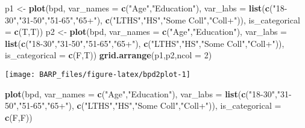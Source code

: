 \documentclass[]{article}
\newenvironment{Shaded}{\begin{snugshade}}{\end{snugshade}}
\newcommand{\KeywordTok}[1]{\textcolor[rgb]{0.13,0.29,0.53}{\textbf{#1}}}
\newcommand{\DataTypeTok}[1]{\textcolor[rgb]{0.13,0.29,0.53}{#1}}
\newcommand{\DecValTok}[1]{\textcolor[rgb]{0.00,0.00,0.81}{#1}}
\newcommand{\StringTok}[1]{\textcolor[rgb]{0.31,0.60,0.02}{#1}}
\newcommand{\NormalTok}[1]{#1}
\begin{document}
\begin{Shaded}
\begin{Highlighting}[]
\NormalTok{p1 <-}\StringTok{ }\KeywordTok{plot}\NormalTok{(bpd,}
     \DataTypeTok{var_names =} \KeywordTok{c}\NormalTok{(}\StringTok{"Age"}\NormalTok{,}\StringTok{"Education"}\NormalTok{),}
     \DataTypeTok{var_labs =} \KeywordTok{list}\NormalTok{(}\KeywordTok{c}\NormalTok{(}\StringTok{"18-30"}\NormalTok{,}\StringTok{"31-50"}\NormalTok{,}\StringTok{"51-65"}\NormalTok{,}\StringTok{"65+"}\NormalTok{),}
                     \KeywordTok{c}\NormalTok{(}\StringTok{"LTHS"}\NormalTok{,}\StringTok{"HS"}\NormalTok{,}\StringTok{"Some Coll"}\NormalTok{,}\StringTok{"Coll+"}\NormalTok{)),}
     \DataTypeTok{is_categorical =} \KeywordTok{c}\NormalTok{(T,T))}
\NormalTok{p2 <-}\StringTok{ }\KeywordTok{plot}\NormalTok{(bpd,}
     \DataTypeTok{var_names =} \KeywordTok{c}\NormalTok{(}\StringTok{"Age"}\NormalTok{,}\StringTok{"Education"}\NormalTok{),}
     \DataTypeTok{var_labs =} \KeywordTok{list}\NormalTok{(}\KeywordTok{c}\NormalTok{(}\StringTok{"18-30"}\NormalTok{,}\StringTok{"31-50"}\NormalTok{,}\StringTok{"51-65"}\NormalTok{,}\StringTok{"65+"}\NormalTok{),}
                     \KeywordTok{c}\NormalTok{(}\StringTok{"LTHS"}\NormalTok{,}\StringTok{"HS"}\NormalTok{,}\StringTok{"Some Coll"}\NormalTok{,}\StringTok{"Coll+"}\NormalTok{)),}
     \DataTypeTok{is_categorical =} \KeywordTok{c}\NormalTok{(F,T))}
\KeywordTok{grid.arrange}\NormalTok{(p1,p2,}\DataTypeTok{ncol =} \DecValTok{2}\NormalTok{)}
\end{Highlighting}
\end{Shaded}

\begin{center}\texttt{[image: BARP\_files/figure-latex/bpd2plot-1]} \end{center}

\begin{Shaded}
\begin{Highlighting}[]
\KeywordTok{plot}\NormalTok{(bpd,}
     \DataTypeTok{var_names =} \KeywordTok{c}\NormalTok{(}\StringTok{"Age"}\NormalTok{,}\StringTok{"Education"}\NormalTok{),}
     \DataTypeTok{var_labs =} \KeywordTok{list}\NormalTok{(}\KeywordTok{c}\NormalTok{(}\StringTok{"18-30"}\NormalTok{,}\StringTok{"31-50"}\NormalTok{,}\StringTok{"51-65"}\NormalTok{,}\StringTok{"65+"}\NormalTok{),}
                     \KeywordTok{c}\NormalTok{(}\StringTok{"LTHS"}\NormalTok{,}\StringTok{"HS"}\NormalTok{,}\StringTok{"Some Coll"}\NormalTok{,}\StringTok{"Coll+"}\NormalTok{)),}
     \DataTypeTok{is_categorical =} \KeywordTok{c}\NormalTok{(F,F))}
\end{Highlighting}
\end{Shaded}
\end{document}

